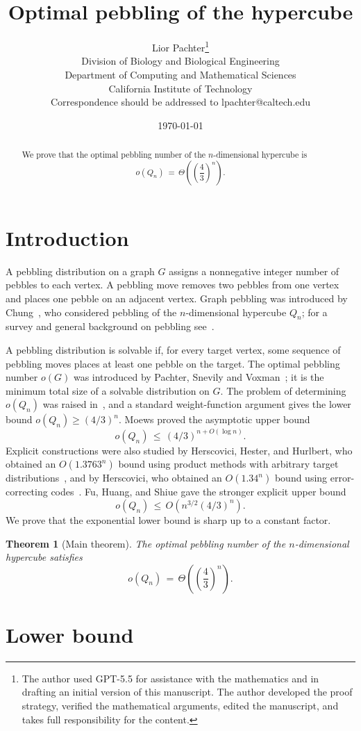 \documentclass[11pt]{article}
\title{Optimal pebbling of the hypercube}
\author{Lior Pachter\thanks{The author used GPT-5.5 for assistance with the mathematics and in drafting an initial version of this manuscript. The author developed the proof strategy, verified the mathematical arguments, edited the manuscript, and takes full responsibility for the content.}\\
\small Division of Biology and Biological Engineering\\
\small Department of Computing and Mathematical Sciences\\
\small California Institute of Technology\\
\small Correspondence should be addressed to lpachter@caltech.edu}
\date{\today}
\theoremstyle{plain}
\newtheorem{theorem}{Theorem}
\theoremstyle{definition}
\begin{document}
\maketitle

\begin{abstract}
We prove that the optimal pebbling number of the $n$-dimensional hypercube is
\[
o(Q_n)\,=\,\Theta\!\left(\left(\frac43\right)^n\right).
\]
\end{abstract}

\section*{Introduction}

A pebbling distribution on a graph $G$ assigns a nonnegative integer number of pebbles to
each vertex.  A pebbling move removes two pebbles from one vertex and places one pebble on
an adjacent vertex.  Graph pebbling was introduced by Chung~\cite{Chung}, who considered
pebbling of the $n$-dimensional hypercube $Q_n$; for a survey and general background on
pebbling see~\cite{HurlbertSurvey}.
\label{def:hypercube}

A pebbling distribution is solvable if, for every target vertex, some sequence
of pebbling moves places at least one pebble on the target.  The optimal pebbling number
$o(G)$ was introduced by Pachter, Snevily and Voxman~\cite{PSV}; it is the minimum total
size of a solvable distribution on $G$.
\label{def:pebbling}
The problem of determining $o(Q_n)$ was raised in~\cite{PSV}, and a standard
weight-function argument gives the lower bound
$o(Q_n)\ge (4/3)^n$.  Moews proved the asymptotic upper bound~\cite{Moews}
\[
o(Q_n)\,\le\, (4/3)^{n+O(\log n)}.
\]
Explicit constructions were also studied by Herscovici, Hester, and Hurlbert,
who obtained an $O(1.3763^n)$ bound using product methods with arbitrary target
distributions~\cite{HHH}, and by Herscovici, who obtained an $O(1.34^n)$ bound
using error-correcting codes~\cite{Herscovici}.  Fu, Huang, and Shiue gave the
stronger explicit upper bound~\cite{FHS}
\[
o(Q_n)\,\le\, O\!\left(n^{3/2}(4/3)^n\right).
\]
We prove that the exponential lower bound is sharp up to a constant factor.

\begin{theorem}[Main theorem]\label{thm:main}
The optimal pebbling number of the $n$-dimensional hypercube satisfies
\[
o(Q_n)\,=\,\Theta\!\left(\left(\frac43\right)^n\right).
\]
\end{theorem}

\section*{Lower bound}
\end{document}
